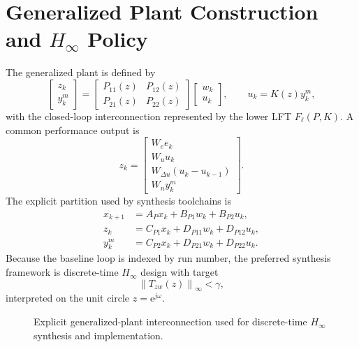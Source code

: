 \documentclass[11pt,a4paper]{article}
\newcommand{\norm}[1]{\left\lVert #1 \right\rVert}
\newcommand{\e}{\mathrm{e}}
\begin{document}
\section{Generalized Plant Construction and $H_{\infty}$ Policy}
The generalized plant is defined by
\[
\begin{bmatrix}z_k\\y_k^m\end{bmatrix}=\begin{bmatrix}P_{11}(z) & P_{12}(z)\\P_{21}(z)&P_{22}(z)\end{bmatrix}\begin{bmatrix}w_k\\u_k\end{bmatrix},
\qquad u_k=K(z)y_k^m,
\]
with the closed-loop interconnection represented by the lower LFT $F_{\ell}(P,K)$. A common performance output is
\[
z_k=\begin{bmatrix}W_e e_k\\W_u u_k\\W_{\Delta u}(u_k-u_{k-1})\\W_n y_k^m\end{bmatrix}.
\]
The explicit partition used by synthesis toolchains is
\begin{align*}
x_{k+1} &= A_Px_k+B_{P1}w_k+B_{P2}u_k,\\
z_k &= C_{P1}x_k+D_{P11}w_k+D_{P12}u_k,\\
y_k^m &= C_{P2}x_k+D_{P21}w_k+D_{P22}u_k.
\end{align*}
Because the baseline loop is indexed by run number, the preferred synthesis framework is discrete-time $H_{\infty}$ design with target
\[
\norm{T_{zw}(z)}_{\infty}<\gamma,
\]
interpreted on the unit circle $z=\e^{j\omega}$.

\begin{figure}[h!]
\centering
{}
\caption{Explicit generalized-plant interconnection used for discrete-time $H_{\infty}$ synthesis and implementation.}
\end{figure}
\end{document}
